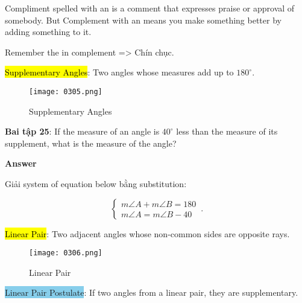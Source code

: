 Compliment spelled with an  is a comment that expresses praise or approval of somebody. But Complement with an  means you make something better by adding something to it.

Remember the  in complement => Chín chục.

\vspace{10 mm}

\hl{Supplementary Angles}: Two angles whose measures add up to $180^{\circ}$.

\begin{figure}[htb!]
  \centering
  \texttt{[image: 0305.png]}
  \caption{Supplementary Angles}
\end{figure}

\textbf{Bai tập 25}: If the measure of an angle is $40^{\circ}$ less than the measure of its supplement, what is the measure of the angle?

\vspace{0.2 cm}

\centerline{\textbf{\normalsize Answer}}

\vspace{0.2 cm}

Giải system of equation below bằng substitution:

\begin{equation*}
    \begin{cases}
      m\angle A + m\angle B = 180\\
      m\angle A = m\angle B -40
    \end{cases}\,.
\end{equation*}

\vspace{5 cm}

\hl{Linear Pair}: Two adjacent angles whose non-common sides are opposite rays.

\begin{figure}[htb!]
  \centering
  \texttt{[image: 0306.png]}
  \caption{Linear Pair}
\end{figure}


\begin{tcolorbox}[colback=RoyalPurple!5!white,colframe=RoyalPurple!75!black]
  \colorbox{SkyBlue}{Linear Pair Postulate}: If two angles from a linear pair, they are supplementary.
\end{tcolorbox}

